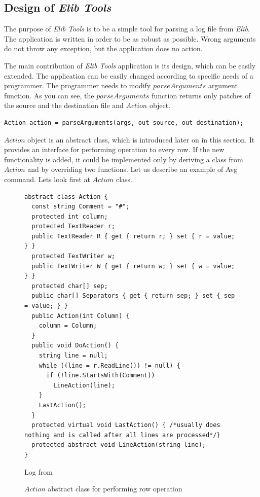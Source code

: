 \subsection*{Design of {\it Elib Tools}}\label{sec:design}
  The purpose of {\it Elib Tools} is to be a simple tool for parsing a log file from {\it Elib}.
  The application is written in order to be as robust as possible.
  Wrong arguments do not throw any exception, but the application does no action.

  The main contribution of {\it Elib Tools} application is its design, which can be easily extended.
  The application can be easily changed according to specific needs of a programmer.
  The programmer needs to modify $parseArguments$ argument function.
  As you can see, the $parseArguments$ function returns only patches 
  of the source and the destination file and $Action$ object.
\begin{lstlisting}
Action action = parseArguments(args, out source, out destination);
\end{lstlisting}
  
  $Action$ object is an abstract class, which is introduced later on in this section. It provides
  an interface for performing operation to every row.
  If the new functionality is added, it could be implemented only by deriving 
  a class from $Action$ and by overriding
  two functions. Let us describe an example of Avg command. Lets look first at $Action$ class.
\begin{figure}[!hbp]
\begin{lstlisting}
abstract class Action {
  const string Comment = "#";
  protected int column;
  protected TextReader r;
  public TextReader R { get { return r; } set { r = value; } }
  protected TextWriter w;
  public TextWriter W { get { return w; } set { w = value; } }
  protected char[] sep;
  public char[] Separators { get { return sep; } set { sep = value; } }
  public Action(int Column) {
    column = Column;
  }
  public void DoAction() {
    string line = null;
    while ((line = r.ReadLine()) != null) {
      if (!line.StartsWith(Comment))
        LineAction(line);
    }
    LastAction();
  }
  protected virtual void LastAction() { /*usually does nothing and is called after all lines are processed*/}
  protected abstract void LineAction(string line);
}
\end{lstlisting}

  Log from 
\caption{$Action$ abstract class for performing row operation}\label{action}
\end{figure}

